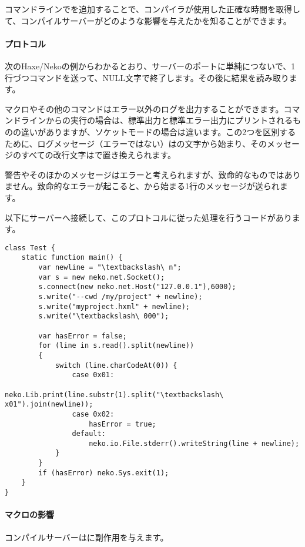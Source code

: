 コマンドラインでを追加することで、コンパイラが使用した正確な時間を取得して、コンパイルサーバーがどのような影響を与えたかを知ることができます。

\paragraph{プロトコル}
次のHaxe/Nekoの例からわかるとおり、サーバーのポートに単純につないで、1行づつコマンドを送って、NULL文字で終了します。その後に結果を読み取ります。

マクロやその他のコマンドはエラー以外のログを出力することができます。コマンドラインからの実行の場合は、標準出力と標準エラー出力にプリントされるものの違いがありますが、ソケットモードの場合は違います。この2つを区別するために、ログメッセージ（エラーではない）はの文字から始まり、そのメッセージのすべての改行文字はで置き換えられます。

警告やそのほかのメッセージはエラーと考えられますが、致命的なものではありません。致命的なエラーが起こると、から始まる1行のメッセージが送られます。

以下にサーバーへ接続して、このプロトコルに従った処理を行うコードがあります。

\begin{lstlisting}
class Test {
    static function main() {
		var newline = "\textbackslash\ n";
        var s = new neko.net.Socket();
        s.connect(new neko.net.Host("127.0.0.1"),6000);
        s.write("--cwd /my/project" + newline);
        s.write("myproject.hxml" + newline);
        s.write("\textbackslash\ 000");
		
        var hasError = false;
        for (line in s.read().split(newline))
		{
            switch (line.charCodeAt(0)) {
				case 0x01: 
					neko.Lib.print(line.substr(1).split("\textbackslash\ x01").join(newline));
				case 0x02: 
					hasError = true;
				default: 
					neko.io.File.stderr().writeString(line + newline);
            }
		}
        if (hasError) neko.Sys.exit(1);
    }
}
\end{lstlisting}

\paragraph{マクロの影響}

コンパイルサーバーはに副作用を与えます。

